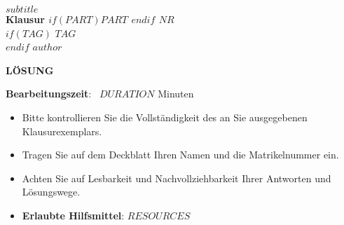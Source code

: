
\begin{coverpages}
    \begin{minipage}[c]{0.75\textwidth}
        \parindent0pt
        \textcolor{headcolor}{\large\scshape{$subtitle$}}\\[1ex]
        \textcolor{headcolor}{\Large\textbf{Klausur $if(PART)$$PART$ \xspace$endif$ $NR$}}\\[2ex]
        $if(TAG)$
        \textbf{$TAG$}\\[2ex]
        $endif$
        \parindent0pt
        $author$
    \end{minipage}
    \begin{minipage}[c]{0.25\textwidth}
        \ifprintanswers
        \hfill\textcolor{dkred}{\textbf{\Huge LÖSUNG}}\hfill\hfill
        \fi
    \end{minipage}
    \vspace{10mm}
    \par\hrulefill\par
    \begin{minipage}[c]{0.5\textwidth}
        \begin{minipage}[c]{0.96\textwidth}
            \vspace{2mm}
            {\textbf{Bearbeitungszeit}: {\ }$DURATION$ Minuten}\par
            \bigskip
            \begin{itemize}
                \item Bitte kontrollieren Sie die Vollständigkeit des an Sie
                ausgegebenen Klausurexemplars.
                \medskip
                \item Tragen Sie auf dem Deckblatt Ihren Namen und die
                Matrikelnummer ein.
                \medskip
                \item Achten Sie auf Lesbarkeit und Nachvollziehbarkeit Ihrer
                Antworten und Lösungswege.
                \medskip
                \item \textbf{Erlaubte Hilfsmittel}: $RESOURCES$



\end{itemize}
\end{minipage}
\end{minipage}
\end{coverpages}
